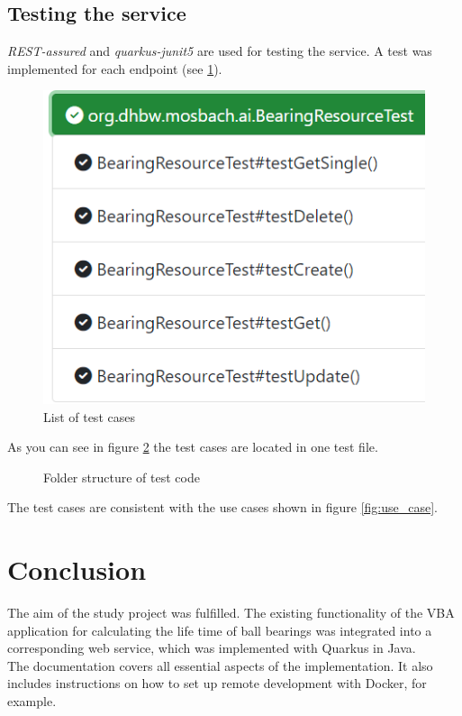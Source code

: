     \section{Testing the service} \label{sec:testing}
        \textit{REST-assured} and \textit{quarkus-junit5} are used for testing the service. A test was implemented for each endpoint (see \ref{fig:testing}). 

        \begin{figure}[h]
            \centering
            \includegraphics{images/testing.png}
            \caption{List of test cases}
            \label{fig:testing}
        \end{figure}


        As you can see in figure \ref{fig:folder_test} the test cases are located in one test file.
        \begin{figure}[h]
            \caption{Folder structure of test code}
            \label{fig:folder_test}
        \end{figure}

        The test cases are consistent with the use cases shown in figure \ref{fig:use_case}.

        


\chapter{Conclusion} %
    The aim of the study project was fulfilled. The existing functionality of the VBA application for calculating the life time of ball bearings was integrated into a corresponding web service, which was implemented with Quarkus in Java. \\
    The documentation covers all essential aspects of the implementation. It also includes instructions on how to set up remote development with Docker, for example.